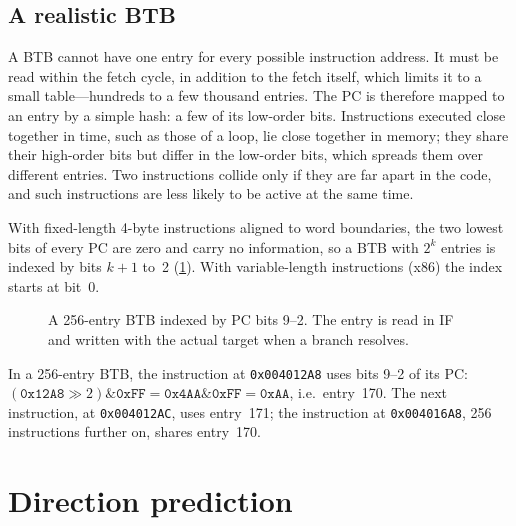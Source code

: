 \documentclass[../main.tex]{subfiles}
\begin{document}
\subsection{A realistic BTB}

A BTB cannot have one entry for every possible instruction address.  It must
be read within the fetch cycle, in addition to the fetch itself, which
limits it to a small table---hundreds to a few thousand entries.  The PC is
therefore mapped to an entry by a simple hash: a few of its low-order bits.
Instructions executed close together in time, such as those of a loop, lie
close together in memory; they share their high-order bits but differ in the
low-order bits, which spreads them over different entries.  Two instructions
collide only if they are far apart in the code, and such instructions are
less likely to be active at the same time.

With fixed-length 4-byte instructions aligned to word boundaries, the two
lowest bits of every PC are zero and carry no information, so a BTB with
$2^k$ entries is indexed by bits $k+1$ to~2 (\cref{fig:l04-btb}).  With
variable-length instructions (x86) the index starts at bit~0.

\begin{figure}[htbp]
  \centering
  
  \caption{A 256-entry BTB indexed by PC bits 9--2.  The entry is read in IF
    and written with the actual target when a branch resolves.}
  \label{fig:l04-btb}
\end{figure}

\begin{example}
  \label{ex:l04-btb-index}
  In a 256-entry BTB, the instruction at \texttt{0x004012A8} uses bits 9--2 of
  its PC: $(\texttt{0x12A8} \gg 2) \mathbin{\&} \texttt{0xFF} =
  \texttt{0x4AA} \mathbin{\&} \texttt{0xFF} = \texttt{0xAA}$, i.e.\
  entry~170.  The next instruction, at \texttt{0x004012AC}, uses entry~171;
  the instruction at \texttt{0x004016A8}, 256 instructions further on, shares
  entry~170.
\end{example}

\section{Direction prediction}
\label{sec:l04-direction}
\end{document}
